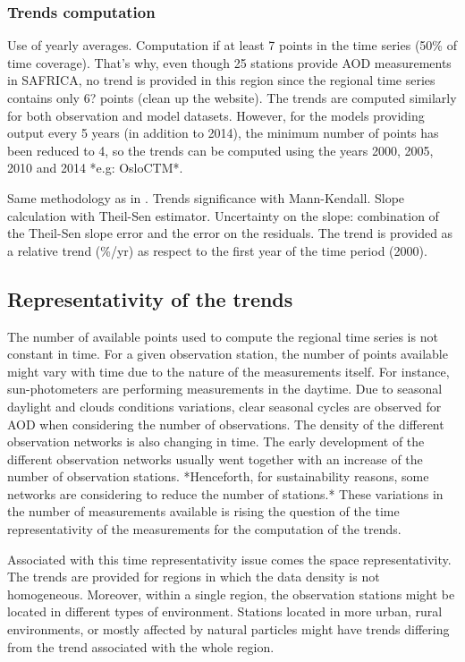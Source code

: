 \documentclass[journal abbreviation, manuscript]{copernicus}
\begin{document}
\subsubsection{Trends computation}
Use of yearly averages. Computation if at least 7 points in the time series (50\% of time coverage). That's why, even though 25 stations provide AOD measurements in SAFRICA, no trend is provided in this region since the regional time series contains only 6? points (clean up the website). The trends are computed similarly for both observation and model datasets. However, for the models providing output every 5 years (in addition to 2014), the minimum number of points has been reduced to 4, so the trends can be computed using the years 2000, 2005, 2010 and 2014 *e.g: OsloCTM*.

Same methodology as in \cite{aas2019global}.
Trends significance with Mann-Kendall.
Slope calculation with Theil-Sen estimator.
Uncertainty on the slope: combination of the Theil-Sen slope error and the error on the residuals.
The trend is provided as a relative trend (\%/yr) as respect to the first year of the time period (2000).

\subsection{Representativity of the trends}
The number of available points used to compute the regional time series is not constant in time. For a given observation station, the number of points available might vary with time due to the nature of the measurements itself. For instance, sun-photometers are performing measurements in the daytime. Due to seasonal daylight and clouds conditions variations, clear seasonal cycles are observed for AOD when considering the number of observations. The density of the different observation networks is also changing in time. The early development of the different observation networks usually went together with an increase of the number of observation stations. *Henceforth, for sustainability reasons, some networks are considering to reduce the number of stations.* These variations in the number of measurements available is rising the question of the time representativity of the measurements for the computation of the trends.

Associated with this time representativity issue comes the space representativity. The trends are provided for regions in which the data density is not homogeneous. Moreover, within a single region, the observation stations might be located in different types of environment. Stations located in more urban, rural environments, or mostly affected by natural particles might have trends differing from the trend associated with the whole region.
\end{document}
